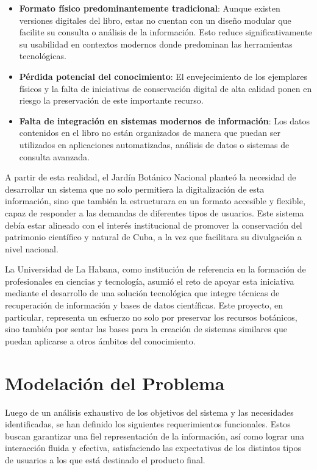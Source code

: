 \begin{itemize}
    \item \textbf{Formato físico predominantemente tradicional}: Aunque existen versiones 
    digitales del libro, estas no cuentan con un diseño modular que facilite su consulta 
    o análisis de la información. Esto reduce significativamente su usabilidad en contextos 
    modernos donde predominan las herramientas tecnológicas.
    \item \textbf{Pérdida potencial del conocimiento}: El envejecimiento de los ejemplares físicos 
    y la falta de iniciativas de conservación digital de alta calidad ponen en riesgo 
    la preservación de este importante recurso.
    \item \textbf{Falta de integración en sistemas modernos de información}: Los datos 
    contenidos en el libro no están organizados de manera que puedan ser utilizados 
    en aplicaciones automatizadas, análisis de datos o sistemas de consulta avanzada.
\end{itemize}

A partir de esta realidad, el Jardín Botánico Nacional planteó la necesidad de desarrollar 
un sistema que no solo permitiera la digitalización de esta información, 
sino que también la estructurara en un formato accesible y flexible, 
capaz de responder a las demandas de diferentes tipos de usuarios. 
Este sistema debía estar alineado con el interés institucional de promover la conservación 
del patrimonio científico y natural de Cuba, a la vez que facilitara su divulgación 
a nivel nacional.

La Universidad de La Habana, como institución de referencia en la formación de 
profesionales en ciencias y tecnología, asumió el reto de apoyar esta iniciativa 
mediante el desarrollo de una solución tecnológica que integre técnicas de recuperación 
de información y bases de datos científicas. Este proyecto, en particular, 
representa un esfuerzo no solo por preservar los recursos botánicos, 
sino también por sentar las bases para la creación de sistemas similares que puedan 
aplicarse a otros ámbitos del conocimiento.





\section{Modelación del Problema}
Luego de un análisis exhaustivo de los objetivos del sistema y las necesidades 
identificadas, se han definido los siguientes requerimientos funcionales. 
Estos buscan garantizar una fiel representación de la información, así como 
lograr una interacción fluida y efectiva, 
satisfaciendo las expectativas de los distintos tipos de usuarios a los
que está destinado el producto final.

